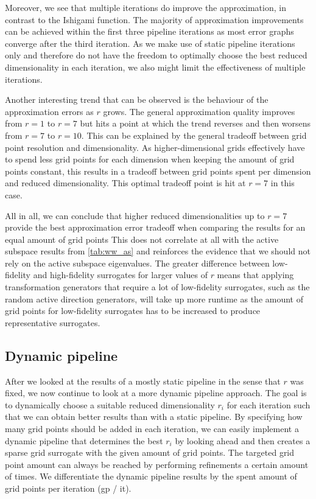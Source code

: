 \documentclass[
  a4paper,  %
  twoside,  %
  bibliography=totoc,
  headsepline,
  cleardoublepage=empty,
  parskip=half,
  draft=false
]{scrbook}
\begin{document}
Moreover, we see that multiple iterations do improve the approximation, in contrast to the Ishigami function.
The majority of approximation improvements can be achieved within the first three pipeline iterations as most error graphs converge after the third iteration.
As we make use of static pipeline iterations only and therefore do not have the freedom to optimally choose the best reduced dimensionality in each iteration, we also might limit the effectiveness of multiple iterations.

Another interesting trend that can be observed is the behaviour of the approximation errors as $r$ grows.
The general approximation quality improves from $r=1$ to $r=7$ but hits a point at which the trend reverses and then worsens from $r=7$ to $r=10$.
This can be explained by the general tradeoff between grid point resolution and dimensionality.
As higher-dimensional grids effectively have to spend less grid points for each dimension when keeping the amount of grid points constant, this results in a tradeoff between grid points spent per dimension and reduced dimensionality.
This optimal tradeoff point is hit at $r=7$ in this case.

All in all, we can conclude that higher reduced dimensionalities up to $r=7$ provide the best approximation error tradeoff when comparing the results for an equal amount of grid points
This does not correlate at all with the active subspace results from \cref{tab:ww_as} and reinforces the evidence that we should not rely on the active subspace eigenvalues.
The greater difference between low-fidelity and high-fidelity surrogates for larger values of $r$ means that applying transformation generators that require a lot of low-fidelity surrogates, such as the random active direction generators, will take up more runtime as the amount of grid points for low-fidelity surrogates has to be increased to produce representative surrogates.

\subsection{Dynamic pipeline}

After we looked at the results of a mostly static pipeline in the sense that $r$ was fixed, we now continue to look at a more dynamic pipeline approach.
The goal is to dynamically choose a suitable reduced dimensionality $r_i$ for each iteration such that we can obtain better results than with a static pipeline.
By specifying how many grid points should be added in each iteration, we can easily implement a dynamic pipeline that determines the best $r_i$ by looking ahead and then creates a sparse grid surrogate with the given amount of grid points.
The targeted grid point amount can always be reached by performing refinements a certain amount of times.
We differentiate the dynamic pipeline results by the spent amount of grid points per iteration (gp / it).
\end{document}
